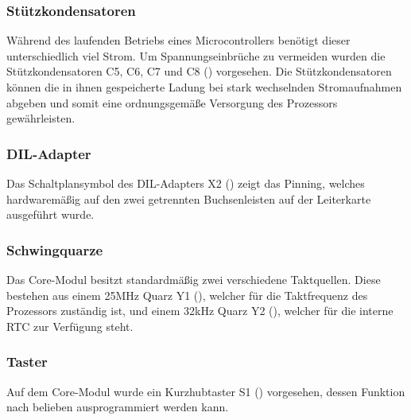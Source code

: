 \subsubsection{Stützkondensatoren}
Während des laufenden Betriebs eines Microcontrollers benötigt dieser unterschiedlich viel Strom. Um Spannungseinbrüche zu vermeiden wurden die Stützkondensatoren C5, C6, C7 und C8 () vorgesehen. Die Stützkondensatoren können die in ihnen gespeicherte Ladung bei stark wechselnden Stromaufnahmen abgeben und somit eine ordnungsgemäße Versorgung des Prozessors gewährleisten.


\subsubsection{DIL-Adapter}
Das Schaltplansymbol des DIL-Adapters X2 () zeigt das Pinning, welches hardwaremäßig auf den zwei getrennten Buchsenleisten auf der Leiterkarte ausgeführt wurde.


\subsubsection{Schwingquarze}
Das \gls{Core-Modul} besitzt standardmäßig zwei verschiedene Taktquellen. Diese bestehen aus einem 25MHz Quarz Y1 (), welcher für die Taktfrequenz des Prozessors zuständig ist, und einem 32kHz Quarz Y2 (), welcher für die interne \gls{RTC} zur Verfügung steht.


\subsubsection{Taster}
Auf dem \gls{Core-Modul} wurde ein Kurzhubtaster S1 () vorgesehen, dessen Funktion nach belieben ausprogrammiert werden kann.

